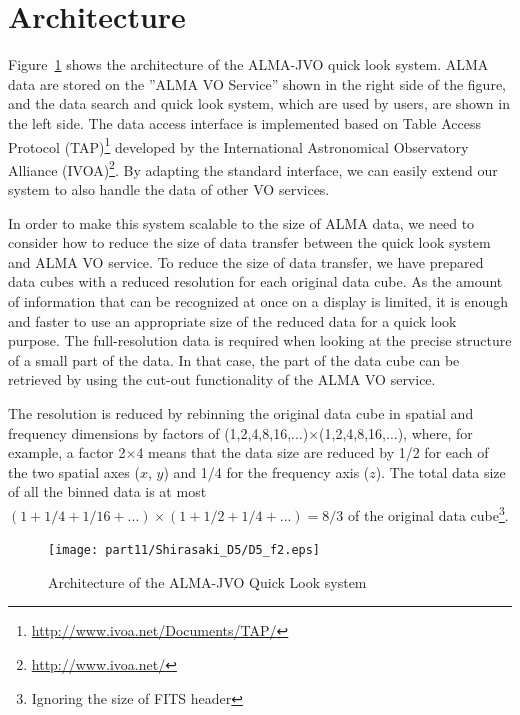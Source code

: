 \section{Architecture}

Figure~\ref{fig:2} shows the architecture of the ALMA-JVO quick look system. ALMA data are stored on the ''ALMA VO Service'' shown in the right side of the figure, and the data search and quick look system, which are used by users, are shown in the left side. The data access interface is implemented based on Table Access Protocol (TAP)\footnote{\url{http://www.ivoa.net/Documents/TAP/}} developed by the International Astronomical Observatory Alliance (IVOA)\footnote{\url{http://www.ivoa.net/}}. By adapting the standard interface, we can easily extend our system to also handle the data of other VO services.

In order to make this system scalable to the size of ALMA data, we need to consider how to reduce the size of data transfer between the quick look system and ALMA VO service. To reduce the size of data transfer, we have prepared data cubes with a reduced resolution for each original data cube. As the amount of information that can be recognized at once on a display  is limited, it is enough and faster to use an appropriate size of the reduced data for a quick look purpose. The full-resolution data is required when looking at the precise structure of a small part of the data. In that case, the part of the data cube can be retrieved by using the cut-out functionality of the ALMA VO service.

The resolution is reduced by rebinning the original data cube in spatial and frequency dimensions by factors of (1,2,4,8,16,...)$\times$(1,2,4,8,16,...), where, for example, a factor 2$\times$4 means that the data size are reduced by 1/2 for each of the two spatial axes ($x$, $y$) and 1/4 for the frequency axis ($z$). The total data size of all the binned data is at most  $(1 + 1/4 + 1/16 + ...) \times (1 + 1/2 + 1/4 + ...) = 8/3$  of the original data cube\footnote{Ignoring the size of FITS header}.


\begin{figure}[t]
\begin{center}
\texttt{[image: part11/Shirasaki\_D5/D5\_f2.eps]}
\caption{Architecture of the ALMA-JVO Quick Look system}
\label{fig:2}
\end{center}
\end{figure}

